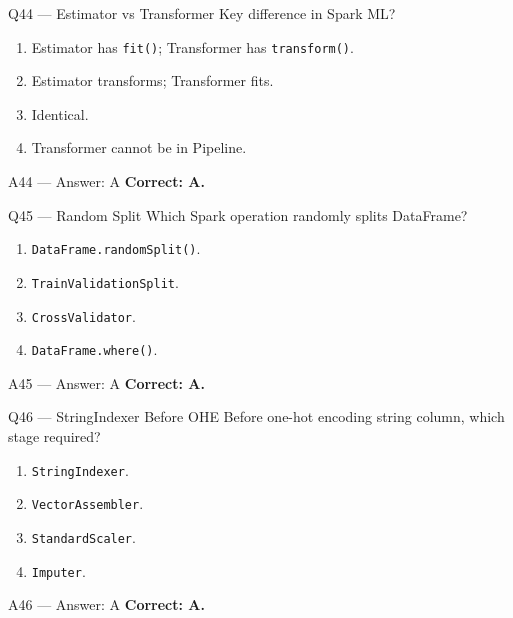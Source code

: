\documentclass[aspectratio=169,9pt]{beamer}
\begin{document}
	\begin{frame}{Q44 — Estimator vs Transformer}
		Key difference in Spark ML?
		\begin{enumerate}[label=\Alph*.]
			\item Estimator has \texttt{fit()}; Transformer has \texttt{transform()}.
			\item Estimator transforms; Transformer fits.
			\item Identical.
			\item Transformer cannot be in Pipeline.
		\end{enumerate}
	\end{frame}
	
	\begin{frame}{A44 — Answer: A}
		\textbf{Correct: A.}
	\end{frame}
	
	\begin{frame}{Q45 — Random Split}
		Which Spark operation randomly splits DataFrame?
		\begin{enumerate}[label=\Alph*.]
			\item \texttt{DataFrame.randomSplit()}.
			\item \texttt{TrainValidationSplit}.
			\item \texttt{CrossValidator}.
			\item \texttt{DataFrame.where()}.
		\end{enumerate}
	\end{frame}
	
	\begin{frame}{A45 — Answer: A}
		\textbf{Correct: A.}
	\end{frame}
	
	\begin{frame}{Q46 — StringIndexer Before OHE}
		Before one-hot encoding string column, which stage required?
		\begin{enumerate}[label=\Alph*.]
			\item \texttt{StringIndexer}.
			\item \texttt{VectorAssembler}.
			\item \texttt{StandardScaler}.
			\item \texttt{Imputer}.
		\end{enumerate}
	\end{frame}
	
	\begin{frame}{A46 — Answer: A}
		\textbf{Correct: A.}
	\end{frame}
	
\end{document}
